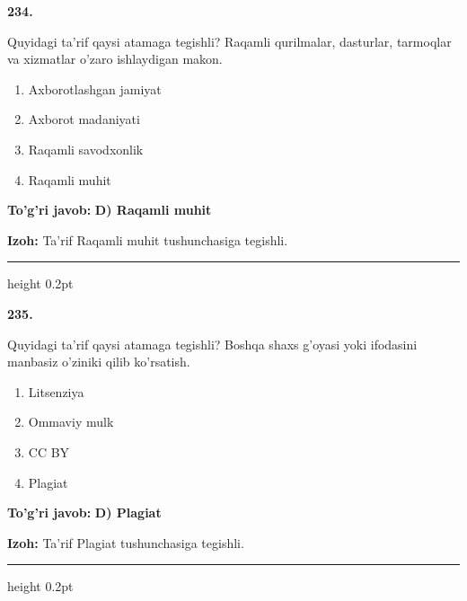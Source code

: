 \documentclass[10pt,a4paper,oneside]{article}
\begin{document}
\noindent\textbf{\color{ink}234.}
\par
Quyidagi ta'rif qaysi atamaga tegishli? Raqamli qurilmalar, dasturlar, tarmoqlar va xizmatlar o'zaro ishlaydigan makon.
\begin{enumerate}[label=\Alph*),leftmargin=9mm]
\item Axborotlashgan jamiyat
\item Axborot madaniyati
\item Raqamli savodxonlik
\item Raqamli muhit
\end{enumerate}
\begin{tcolorbox}[enhanced,breakable,colback=teal!4,colframe=teal!50!black,boxrule=0.5pt,arc=1.1mm,left=3mm,right=3mm,top=1.7mm,bottom=1.7mm,before skip=2mm,after skip=2mm]
\textbf{\color{teal}To'g'ri javob:} \textbf{D) Raqamli muhit}
\par\smallskip
\textbf{Izoh:} Ta'rif Raqamli muhit tushunchasiga tegishli.
\end{tcolorbox}
\vspace{2mm}\hrule height 0.2pt \vspace{3mm}

\noindent\textbf{\color{ink}235.}
\par
Quyidagi ta'rif qaysi atamaga tegishli? Boshqa shaxs g'oyasi yoki ifodasini manbasiz o'ziniki qilib ko'rsatish.
\begin{enumerate}[label=\Alph*),leftmargin=9mm]
\item Litsenziya
\item Ommaviy mulk
\item CC BY
\item Plagiat
\end{enumerate}
\begin{tcolorbox}[enhanced,breakable,colback=teal!4,colframe=teal!50!black,boxrule=0.5pt,arc=1.1mm,left=3mm,right=3mm,top=1.7mm,bottom=1.7mm,before skip=2mm,after skip=2mm]
\textbf{\color{teal}To'g'ri javob:} \textbf{D) Plagiat}
\par\smallskip
\textbf{Izoh:} Ta'rif Plagiat tushunchasiga tegishli.
\end{tcolorbox}
\vspace{2mm}\hrule height 0.2pt \vspace{3mm}
\end{document}
